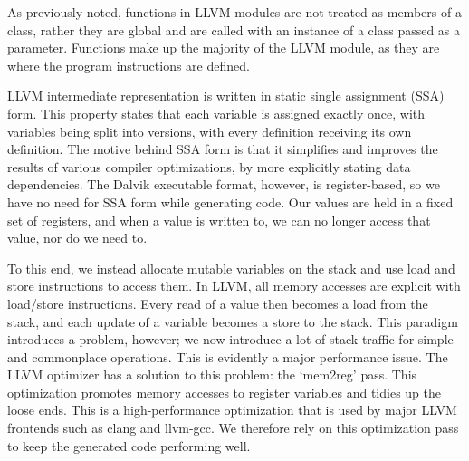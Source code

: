As previously noted, functions in LLVM modules are not treated as members of a class, rather they are global and are called with an instance of a class passed as a parameter. Functions make up the majority of the LLVM module, as they are where the program instructions are defined.

LLVM intermediate representation is written in static single assignment (SSA) form. This property states that each variable is assigned exactly once, with variables being split into versions, with every definition receiving its own definition. The motive behind SSA form is that it simplifies and improves the results of various compiler optimizations, by more explicitly stating data dependencies. The Dalvik executable format, however, is register-based, so we have no need for SSA form while generating code. Our values are held in a fixed set of registers, and when a value is written to, we can no longer access that value, nor do we need to.

To this end, we instead allocate mutable variables on the stack and use load and store instructions to access them. In LLVM, all memory accesses are explicit with load/store instructions. Every read of a value then becomes a load from the stack, and each update of a variable becomes a store to the stack. This paradigm introduces a problem, however; we now introduce a lot of stack traffic for simple and commonplace operations. This is evidently a major performance issue. The LLVM optimizer has a solution to this problem: the `mem2reg' pass. This optimization promotes memory accesses to register variables and tidies up the loose ends. This is a high-performance optimization that is used by major LLVM frontends such as clang and llvm-gcc\footnotemark {}. We therefore rely on this optimization pass to keep the generated code performing well.


